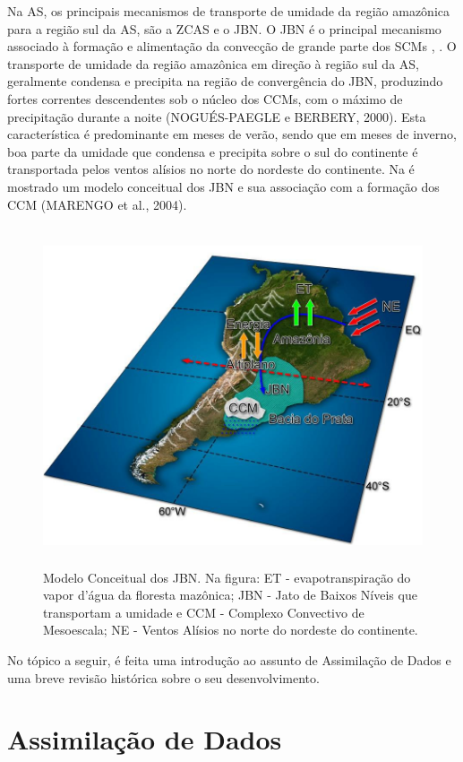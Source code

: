Na AS, os principais mecanismos de transporte de umidade da região amazônica para a região sul da AS, são a ZCAS e o JBN. O JBN é o principal mecanismo associado à formação e alimentação da convecção de grande parte dos SCMs \cite{ferreiraetal03}, \cite{herdiesetal02}. O transporte de umidade da região amazônica em direção à região sul da AS, geralmente condensa e precipita na região de convergência do JBN, produzindo fortes correntes descendentes sob o núcleo dos CCMs, com o máximo de precipitação durante a noite (NOGUÉS-PAEGLE e BERBERY, 2000). Esta característica é predominante em meses de verão, sendo que em meses de inverno, boa parte da umidade que condensa e precipita sobre o sul do continente é transportada pelos ventos alísios no norte do nordeste do continente. Na \auto é mostrado um modelo conceitual dos JBN e sua associação com a formação dos CCM (MARENGO et al., 2004).

\begin{figure}
\includegraphics[height=10cm]{./figs/fig10.png}
\caption{Modelo Conceitual dos JBN. Na figura: ET - evapotranspiração do vapor d'água da floresta mazônica; JBN - Jato de Baixos Níveis que transportam a umidade e CCM - Complexo Convectivo de Mesoescala; NE - Ventos Alísios no norte do nordeste do continente.}
\label{fig10}
\end{figure}

No tópico a seguir, é feita uma introdução ao assunto de Assimilação de Dados e uma breve revisão histórica sobre o seu desenvolvimento.

\section{Assimilação de Dados}
\label{ss:assimdados}

